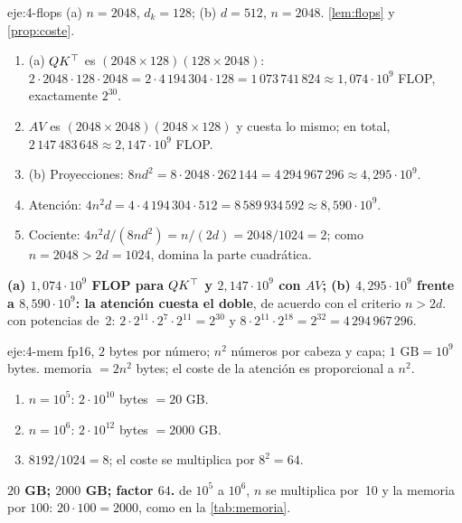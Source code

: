 \begin{solucion}{eje:4-flops}
\datos (a) $n=2048$, $d_k=128$; (b) $d=512$, $n=2048$.
\planteamiento \cref{lem:flops} y \cref{prop:coste}.
\pasos
\begin{enumerate}[label=\arabic*.]
  \item (a) $QK^{\top}$ es $(2048\times128)(128\times2048)$: $2\cdot2048\cdot128\cdot2048=2\cdot4\,194\,304\cdot128=1\,073\,741\,824\approx1{,}074\cdot10^{9}$ FLOP, exactamente $2^{30}$.
  \item $AV$ es $(2048\times2048)(2048\times128)$ y cuesta lo mismo; en total, $2\,147\,483\,648\approx2{,}147\cdot10^{9}$ FLOP.
  \item (b) Proyecciones: $8nd^{2}=8\cdot2048\cdot262\,144=4\,294\,967\,296\approx4{,}295\cdot10^{9}$.
  \item Atención: $4n^{2}d=4\cdot4\,194\,304\cdot512=8\,589\,934\,592\approx8{,}590\cdot10^{9}$.
  \item Cociente: $4n^{2}d/(8nd^{2})=n/(2d)=2048/1024=2$; como $n=2048>2d=1024$, domina la parte cuadrática.
\end{enumerate}
\resultado \textbf{(a) $1{,}074\cdot10^{9}$ FLOP para $QK^{\top}$ y $2{,}147\cdot10^{9}$ con $AV$; (b) $4{,}295\cdot10^{9}$ frente a $8{,}590\cdot10^{9}$: la atención cuesta el doble}, de acuerdo con el criterio $n>2d$.
\comprobacion con potencias de~2: $2\cdot2^{11}\cdot2^{7}\cdot2^{11}=2^{30}$ y $8\cdot2^{11}\cdot2^{18}=2^{32}=4\,294\,967\,296$.
\end{solucion}

\begin{solucion}{eje:4-mem}
\datos fp16, $2$ bytes por número; $n^{2}$ números por cabeza y capa; $1\text{ GB}=10^{9}$ bytes.
\planteamiento memoria $=2n^{2}$ bytes; el coste de la atención es proporcional a $n^{2}$.
\pasos
\begin{enumerate}[label=\arabic*.]
  \item $n=10^{5}$: $2\cdot10^{10}$ bytes $=20$ GB.
  \item $n=10^{6}$: $2\cdot10^{12}$ bytes $=2000$ GB.
  \item $8192/1024=8$; el coste se multiplica por $8^{2}=64$.
\end{enumerate}
\resultado \textbf{$20$ GB; $2000$ GB; factor $64$.}
\comprobacion de $10^{5}$ a $10^{6}$, $n$ se multiplica por~10 y la memoria por $100$: $20\cdot100=2000$, como en la \cref{tab:memoria}.
\end{solucion}

